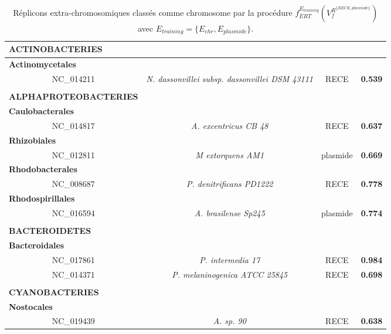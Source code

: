 \begin{table}[H]
	\caption[Réplicons extra-chromosomiques classés comme chromosome]{Réplicons extra-chromosomiques classés comme chromosome par la procédure $f_{ERT}^{E_{training}}(V_{f}^{R^{\{RECE,plasmide\}}})$ avec $E_{training}=\{E_{chr},E_{plasmide}\}$. }\label{tabclassifrec}
	\begin{footnotesize}
	\begin{tabular}{c>{\itshape}cc>{\bfseries}c}
		\multicolumn{1}{l}{\textbf{ACTINOBACTERIES}}\\
		\hline
		\multicolumn{1}{l}{\textbf{Actinomycetales}}\\
		NC\_014211 & N. dassonvillei \textnormal{subsp.} dassonvillei \textnormal{DSM 43111} & RECE & 0.539\\
		\\[0.6cm]
		\multicolumn{1}{l}{\textbf{ALPHAPROTEOBACTERIES}}\\
		\hline
		\multicolumn{1}{l}{\textbf{Caulobacterales}}\\
		NC\_014817 & A. excentricus \textnormal{CB 48} & RECE & 0.637\\
		\multicolumn{1}{l}{\textbf{Rhizobiales}}\\
		NC\_012811 & M extorquens \textnormal{AM1} & plasmide & 0.669\\
		\multicolumn{1}{l}{\textbf{Rhodobacterales}}\\
		NC\_008687 & P. denitrificans \textnormal{PD1222} & RECE & 0.778\\
		\multicolumn{1}{l}{\textbf{Rhodospirillales}}\\
		NC\_016594 & A. brasilense \textnormal{Sp245} & plasmide & 0.774\\
		\\[0.6cm]
		\multicolumn{1}{l}{\textbf{BACTEROIDETES}}\\
		\hline
		\multicolumn{1}{l}{\textbf{Bacteroidales}}\\
		NC\_017861 & P. intermedia \textnormal{17} & RECE & 0.984\\
		NC\_014371 & P. melaninogenica \textnormal{ATCC 25845} & RECE & 0.698\\
		\\[0.6cm]
		\multicolumn{1}{l}{\textbf{CYANOBACTERIES}}\\
		\hline
		\multicolumn{1}{l}{\textbf{Nostocales}}\\
		NC\_019439 & A. \textnormal{sp. 90} & RECE & 0.638\\
	\end{tabular}
	\end{footnotesize}
\end{table}

